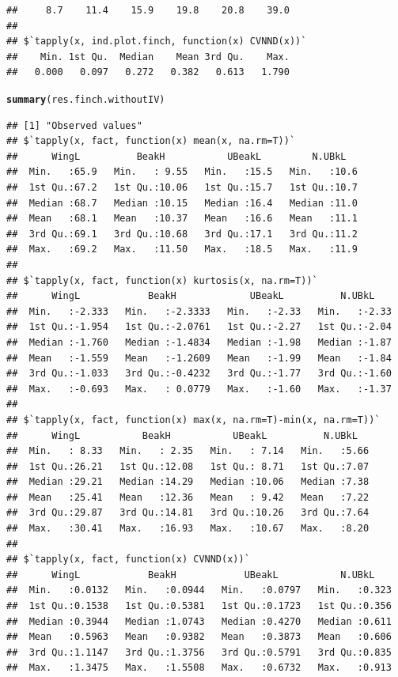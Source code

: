 \documentclass[12pt]{article}\usepackage[]{graphicx}\usepackage[]{color}
\makeatletter
\newcommand{\hlstd}[1]{\textcolor[rgb]{0.345,0.345,0.345}{#1}}%
\newcommand{\hlkwd}[1]{\textcolor[rgb]{0.737,0.353,0.396}{\textbf{#1}}}%
\newenvironment{kframe}{%
 \def\at@end@of@kframe{}%
 \ifinner\ifhmode%
  \def\at@end@of@kframe{\end{minipage}}%
  \begin{minipage}{\columnwidth}%
 \fi\fi%
 \def\FrameCommand##1{\hskip\@totalleftmargin \hskip-\fboxsep
 \colorbox{shadecolor}{##1}\hskip-\fboxsep
     \hskip-\linewidth \hskip-\@totalleftmargin \hskip\columnwidth}%
 \MakeFramed {\advance\hsize-\width
   \@totalleftmargin\z@ \linewidth\hsize
   \@setminipage}}%
 {\par\unskip\endMakeFramed%
 \at@end@of@kframe}
\newenvironment{knitrout}{}{} %
\makeatother
\begin{document}
\begin{knitrout}
\begin{kframe}
\begin{verbatim}
##     8.7    11.4    15.9    19.8    20.8    39.0 
## 
## $`tapply(x, ind.plot.finch, function(x) CVNND(x))`
##    Min. 1st Qu.  Median    Mean 3rd Qu.    Max. 
##   0.000   0.097   0.272   0.382   0.613   1.790
\end{verbatim}
\begin{alltt}
\hlkwd{summary}\hlstd{(res.finch.withoutIV)}
\end{alltt}
\begin{verbatim}
## [1] "Observed values"
## $`tapply(x, fact, function(x) mean(x, na.rm=T))`
##      WingL          BeakH           UBeakL         N.UBkL    
##  Min.   :65.9   Min.   : 9.55   Min.   :15.5   Min.   :10.6  
##  1st Qu.:67.2   1st Qu.:10.06   1st Qu.:15.7   1st Qu.:10.7  
##  Median :68.7   Median :10.15   Median :16.4   Median :11.0  
##  Mean   :68.1   Mean   :10.37   Mean   :16.6   Mean   :11.1  
##  3rd Qu.:69.1   3rd Qu.:10.68   3rd Qu.:17.1   3rd Qu.:11.2  
##  Max.   :69.2   Max.   :11.50   Max.   :18.5   Max.   :11.9  
## 
## $`tapply(x, fact, function(x) kurtosis(x, na.rm=T))`
##      WingL            BeakH             UBeakL          N.UBkL     
##  Min.   :-2.333   Min.   :-2.3333   Min.   :-2.33   Min.   :-2.33  
##  1st Qu.:-1.954   1st Qu.:-2.0761   1st Qu.:-2.27   1st Qu.:-2.04  
##  Median :-1.760   Median :-1.4834   Median :-1.98   Median :-1.87  
##  Mean   :-1.559   Mean   :-1.2609   Mean   :-1.99   Mean   :-1.84  
##  3rd Qu.:-1.033   3rd Qu.:-0.4232   3rd Qu.:-1.77   3rd Qu.:-1.60  
##  Max.   :-0.693   Max.   : 0.0779   Max.   :-1.60   Max.   :-1.37  
## 
## $`tapply(x, fact, function(x) max(x, na.rm=T)-min(x, na.rm=T))`
##      WingL           BeakH           UBeakL          N.UBkL    
##  Min.   : 8.33   Min.   : 2.35   Min.   : 7.14   Min.   :5.66  
##  1st Qu.:26.21   1st Qu.:12.08   1st Qu.: 8.71   1st Qu.:7.07  
##  Median :29.21   Median :14.29   Median :10.06   Median :7.38  
##  Mean   :25.41   Mean   :12.36   Mean   : 9.42   Mean   :7.22  
##  3rd Qu.:29.87   3rd Qu.:14.81   3rd Qu.:10.26   3rd Qu.:7.64  
##  Max.   :30.41   Max.   :16.93   Max.   :10.67   Max.   :8.20  
## 
## $`tapply(x, fact, function(x) CVNND(x))`
##      WingL            BeakH            UBeakL           N.UBkL     
##  Min.   :0.0132   Min.   :0.0944   Min.   :0.0797   Min.   :0.323  
##  1st Qu.:0.1538   1st Qu.:0.5381   1st Qu.:0.1723   1st Qu.:0.356  
##  Median :0.3944   Median :1.0743   Median :0.4270   Median :0.611  
##  Mean   :0.5963   Mean   :0.9382   Mean   :0.3873   Mean   :0.606  
##  3rd Qu.:1.1147   3rd Qu.:1.3756   3rd Qu.:0.5791   3rd Qu.:0.835  
##  Max.   :1.3475   Max.   :1.5508   Max.   :0.6732   Max.   :0.913  

\end{verbatim}
\end{kframe}
\end{knitrout}
\end{document}
